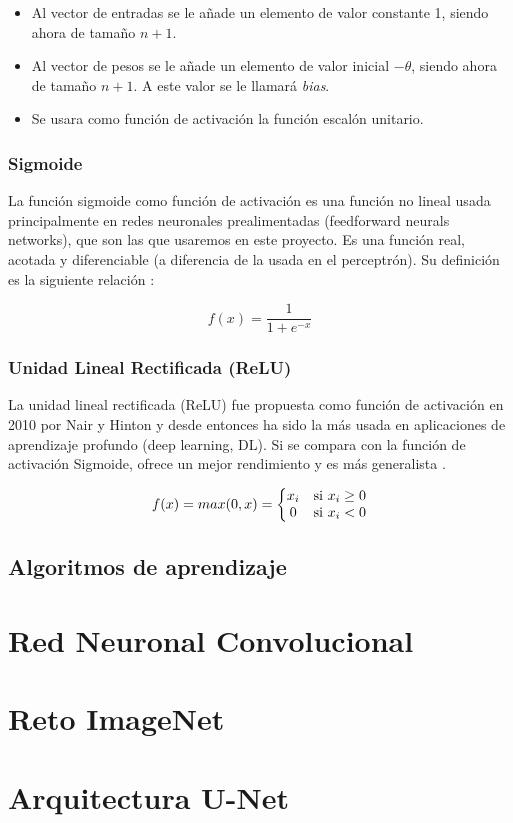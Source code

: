 \begin{itemize}
\item Al vector de entradas se le añade un elemento de valor constante 1, siendo ahora de tamaño $ n+1 $.
\item Al vector de pesos se le añade un elemento de valor inicial $ -\theta $, siendo ahora de tamaño $ n+1 $. A este valor se le llamará \textit{bias}.
\item Se usara como función de activación la función escalón unitario.
\end{itemize}


\subsubsection{Sigmoide}\label{subsubsec:sigmoide}

La función sigmoide como función de activación es una función no lineal usada principalmente en redes neuronales prealimentadas (feedforward neurals networks), que son las que usaremos en este proyecto. Es una función real, acotada y diferenciable (a diferencia de la usada en el perceptrón). Su definición es la siguiente relación \cite{nwankpa2018activation}:

\begin{equation}
 f(x) = \frac{1}{1+e^{-x}}
\end{equation}

\subsubsection{Unidad Lineal Rectificada (ReLU)}\label{subsubsec:relu}

La unidad lineal rectificada (ReLU) fue propuesta como función de activación en 2010 por Nair y Hinton \cite{Nair2010} y desde entonces ha sido la más usada en aplicaciones de aprendizaje profundo (deep learning, DL). Si se compara con la función de activación Sigmoide, ofrece un mejor rendimiento y es más generalista \cite{nwankpa2018activation}.

\begin{equation}
 f(x) = max(0, x)=\left\{\begin{matrix}
 x_i & $si $ x_i \geq 0 \\ 
 0 & $si $ x_i < 0
\end{matrix}\right.
\end{equation}

\subsection{Algoritmos de aprendizaje}\label{subsec:learning_algos}
\section{Red Neuronal Convolucional}\label{sec:cnn}
\section{Reto ImageNet}\label{sec:imagenet}
\section{Arquitectura U-Net}\label{sec:unet}
